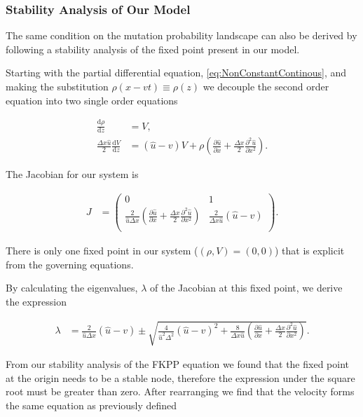\documentclass[12pt, a4paper,]{article}
\begin{document}
\subsubsection{Stability Analysis of Our Model}
The same condition on the mutation probability landscape can also be derived by following a stability analysis of the fixed point present in our model. 

Starting with the partial differential equation, \eqref{eq:NonConstantContinous}, and making the substitution $\rho(x-vt)\equiv \rho (z)$ we decouple the second order equation into two single order equations

\begin{align}
\frac{\mathrm{d} \rho}{\mathrm{d} z} & = V, \\
\frac{\Delta x \hat{u}}{2} \frac{\mathrm{d} V}{\mathrm{d} z} & = (\hat{u} - v) V + \rho \left( \frac{\partial \hat{u}}{\partial x} + \frac{\Delta x}{2} \frac{\partial ^2 \hat{u}}{\partial x ^2} \right).
\end{align}

The Jacobian for our system is 

\begin{align*}
J & = \begin{pmatrix}
0 & 1 \\
\frac{2}{\hat{u} \Delta x} \left( \frac{\partial \hat{u}}{\partial x} + \frac{\Delta x}{2} \frac{\partial ^2 \hat{u}}{\partial x ^2} \right) & \frac{2}{\Delta x \hat{u}} (\hat{u} - v) \\
\end{pmatrix}.
\end{align*}

There is only one fixed point in our system ($(\rho, V) = (0,0)$) that is explicit from the governing equations.  

By calculating the eigenvalues, $\lambda $ of the Jacobian at this fixed point, we derive the expression 

\begin{align*}
\lambda & = \frac{2}{\hat{u} \Delta x} (\hat{u} - v) \pm \sqrt{\frac{4}{\hat{u} ^2 \Delta ^2 }(\hat{u} - v )^2 + \frac{8}{\Delta x \hat{u}}\left( \frac{\partial \hat{u}}{\partial x} + \frac{\Delta x}{2} \frac{\partial ^2 \hat{u}}{\partial x ^2} \right) }.
\end{align*}

From our stability analysis of the FKPP equation we found that the fixed point at the origin needs to be a stable node, therefore the expression under the square root must be greater than zero. After rearranging we find that the velocity forms the same equation as previously defined
\end{document}
